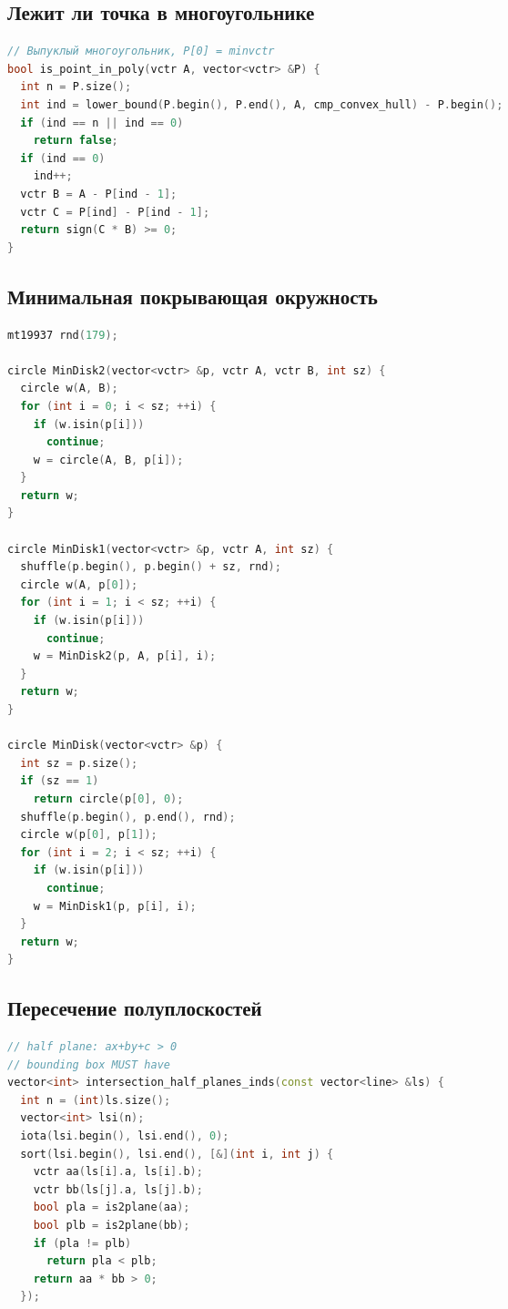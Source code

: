 \documentclass[9pt,a4paper,landscape,twosided]{extarticle}
\begin{document}
\begin{multicols*}{3}
\begin{lstlisting}[language=C++]
\end{lstlisting}

\subsection{Лежит ли точка в многоугольнике}
\begin{lstlisting}[language=C++]
// Выпуклый многоугольник, P[0] = minvctr
bool is_point_in_poly(vctr A, vector<vctr> &P) {
  int n = P.size();
  int ind = lower_bound(P.begin(), P.end(), A, cmp_convex_hull) - P.begin();
  if (ind == n || ind == 0)
    return false;
  if (ind == 0)
    ind++;
  vctr B = A - P[ind - 1];
  vctr C = P[ind] - P[ind - 1];
  return sign(C * B) >= 0;
}

\end{lstlisting}

\subsection{Минимальная покрывающая окружность}
\begin{lstlisting}[language=C++]
mt19937 rnd(179);

circle MinDisk2(vector<vctr> &p, vctr A, vctr B, int sz) {
  circle w(A, B);
  for (int i = 0; i < sz; ++i) {
    if (w.isin(p[i]))
      continue;
    w = circle(A, B, p[i]);
  }
  return w;
}

circle MinDisk1(vector<vctr> &p, vctr A, int sz) {
  shuffle(p.begin(), p.begin() + sz, rnd);
  circle w(A, p[0]);
  for (int i = 1; i < sz; ++i) {
    if (w.isin(p[i]))
      continue;
    w = MinDisk2(p, A, p[i], i);
  }
  return w;
}

circle MinDisk(vector<vctr> &p) {
  int sz = p.size();
  if (sz == 1)
    return circle(p[0], 0);
  shuffle(p.begin(), p.end(), rnd);
  circle w(p[0], p[1]);
  for (int i = 2; i < sz; ++i) {
    if (w.isin(p[i]))
      continue;
    w = MinDisk1(p, p[i], i);
  }
  return w;
}

\end{lstlisting}

\subsection{Пересечение полуплоскостей}
\begin{lstlisting}[language=C++]
// half plane: ax+by+c > 0
// bounding box MUST have
vector<int> intersection_half_planes_inds(const vector<line> &ls) {
  int n = (int)ls.size();
  vector<int> lsi(n);
  iota(lsi.begin(), lsi.end(), 0);
  sort(lsi.begin(), lsi.end(), [&](int i, int j) {
    vctr aa(ls[i].a, ls[i].b);
    vctr bb(ls[j].a, ls[j].b);
    bool pla = is2plane(aa);
    bool plb = is2plane(bb);
    if (pla != plb)
      return pla < plb;
    return aa * bb > 0;
  });


\end{lstlisting}
\end{multicols*}
\end{document}
